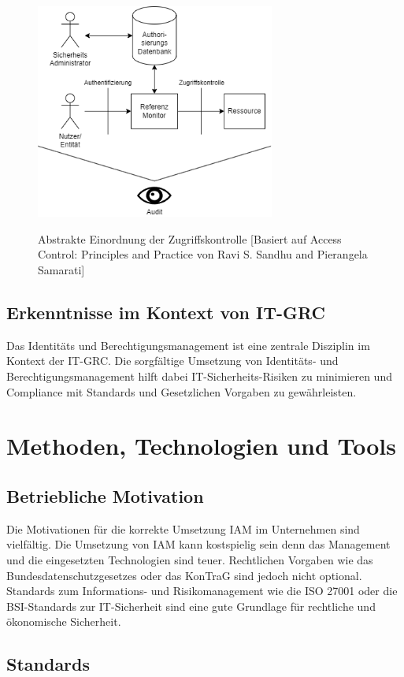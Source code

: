 \documentclass[10pt]{article}
\begin{document}
\begin{figure}
  \centering
  \includegraphics[width=0.7\textwidth]{assets/accessmanagement.png}
  \label{fig:accesscontrol}
  \caption{Abstrakte Einordnung der Zugriffskontrolle [Basiert auf Access Control: Principles and Practice von Ravi S. Sandhu and Pierangela Samarati]}
\end{figure}
\subsection{Erkenntnisse im Kontext von IT-GRC}
Das Identitäts und Berechtigungsmanagement ist eine zentrale Disziplin im Kontext der IT-GRC. Die sorgfältige Umsetzung von Identitäts- und Berechtigungsmanagement hilft dabei IT-Sicherheits-Risiken zu minimieren und Compliance mit Standards und Gesetzlichen Vorgaben zu gewährleisten.
\section{Methoden, Technologien und Tools}
\label{sec:existing}
\subsection{Betriebliche Motivation}
Die Motivationen für die korrekte Umsetzung IAM im Unternehmen sind vielfältig. Die Umsetzung von IAM kann kostspielig sein denn das Management und die eingesetzten Technologien sind teuer. Rechtlichen Vorgaben wie das Bundesdatenschutzgesetzes oder das KonTraG sind jedoch nicht optional. Standards zum Informations- und Risikomanagement wie die ISO 27001 oder die BSI-Standards zur IT-Sicherheit sind eine gute Grundlage für rechtliche und ökonomische Sicherheit.~\cite{tsolkas2017}
\subsection{Standards}
\end{document}
